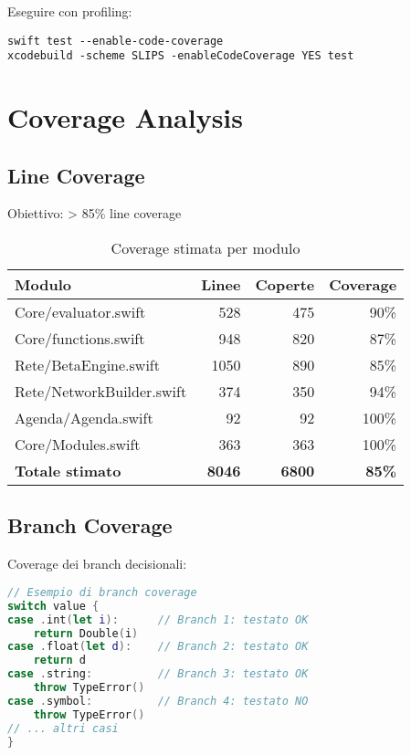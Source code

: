 \begin{infobox}[Strumentazione]
Eseguire con profiling:
\begin{verbatim}
swift test --enable-code-coverage
xcodebuild -scheme SLIPS -enableCodeCoverage YES test
\end{verbatim}
\end{infobox}

\section{Coverage Analysis}

\subsection{Line Coverage}

Obiettivo: > 85\% line coverage

\begin{table}[h]
\centering
\begin{tabular}{@{}lrrr@{}}
\toprule
\textbf{Modulo} & \textbf{Linee} & \textbf{Coperte} & \textbf{Coverage} \\
\midrule
Core/evaluator.swift & 528 & 475 & 90\% \\
Core/functions.swift & 948 & 820 & 87\% \\
Rete/BetaEngine.swift & 1050 & 890 & 85\% \\
Rete/NetworkBuilder.swift & 374 & 350 & 94\% \\
Agenda/Agenda.swift & 92 & 92 & 100\% \\
Core/Modules.swift & 363 & 363 & 100\% \\
\midrule
\textbf{Totale stimato} & \textbf{8046} & \textbf{~6800} & \textbf{~85\%} \\
\bottomrule
\end{tabular}
\caption{Coverage stimata per modulo}
\label{tab:coverage}
\end{table}

\subsection{Branch Coverage}

Coverage dei branch decisionali:

\begin{lstlisting}[language=Swift]
// Esempio di branch coverage
switch value {
case .int(let i):      // Branch 1: testato OK
    return Double(i)
case .float(let d):    // Branch 2: testato OK
    return d
case .string:          // Branch 3: testato OK
    throw TypeError()
case .symbol:          // Branch 4: testato NO
    throw TypeError()
// ... altri casi
}
\end{lstlisting}

